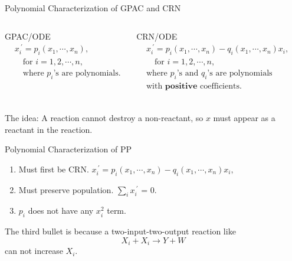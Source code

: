 \documentclass[aspectratio=169]{beamer}
\begin{document}
\begin{frame}[Clean]{Polynomial Characterization of GPAC and CRN}
    \begin{columns}
         \vspace*{-0.6em}
        \begin{block}{GPAC/ODE}
            \vspace*{-1em}
            \begin{align*}
                &x_i^{\ \prime  }= p_i(x_1,\cdots,x_n), \\
                 &\quad\text{for $i=1,2,\cdots,n$},\\
                 &\quad\text{where $p_i$'s are polynomials.}
            \end{align*}
            \vspace*{-2.5em}
        \end{block}


        \vspace*{0.5em}
        \begin{block}{CRN/ODE\footnotemark}
            \vspace*{-1em}
            \begin{align*}
                &x_i^{\ \prime}=p_i(x_1,\cdots, x_n)-q_i(x_1,\cdots, x_n)x_i,\\
                &\quad\text{for $i=1,2,\cdots,n$},\\
                &\text{where $p_i$'s and $q_i$'s are polynomials} \\
                &\text{with }\mathbf{positive} \text{ coefficients.}\\
            \end{align*}
            \vspace*{-3.5em}

        \end{block}
   \end{columns}
\hspace{2em}
The idea: A reaction cannot destroy a non-reactant, so $x$ must
appear as a reactant in the reaction.
\end{frame}
\begin{frame}{Polynomial Characterization of PP}
\begin{enumerate}
    \item Must first be CRN. $x_i^{\ \prime}=p_i(x_1,\cdots, x_n)-q_i(x_1,\cdots, x_n)x_i,$
    \item Must preserve population. $\sum_{i} x_i^{\ \prime}$ = 0.
    \item $p_i$ does not have any $x_i^2$ term.
\end{enumerate}
The third bullet is because a two-input-two-output reaction like
\[
    X_i + X_i \to  Y + W
\]
can not increase $X_i$.
\end{frame}
\end{document}

